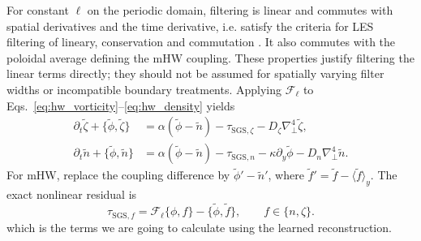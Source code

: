 \documentclass[authoryear,preprint,review,12pt]{elsarticle}
\begin{document}
For constant $\ell$ on the periodic domain, filtering is linear and commutes with spatial derivatives and the time derivative, i.e. satisfy the criteria for LES filtering of lineary, conservation and commutation \citep{sagaut_large_2006}. It also commutes with the poloidal average defining the mHW coupling. These properties justify filtering the linear terms directly; they should not be assumed for spatially varying filter widths or incompatible boundary treatments. Applying $\mathcal{F}_\ell$ to Eqs.~\eqref{eq:hw_vorticity}--\eqref{eq:hw_density} yields
\begin{align}
    \partial_t\widetilde\zeta+\{\widetilde\phi,\widetilde\zeta\}
    &=\alpha(\widetilde\phi-\widetilde n)
      -\tau_{\mathrm{SGS},\zeta}-D_\zeta\nabla_\perp^4\widetilde\zeta,
    \label{eq:filtered_hw_vorticity}\\
    \partial_t\widetilde n+\{\widetilde\phi,\widetilde n\}
    &=\alpha(\widetilde\phi-\widetilde n)
      -\tau_{\mathrm{SGS},n}-\kappa\partial_y\widetilde\phi
      -D_n\nabla_\perp^4\widetilde n.
    \label{eq:filtered_hw_density}
\end{align}
For mHW, replace the coupling difference by $\widetilde\phi'-\widetilde n'$, where $\widetilde f'=\widetilde f-\langle\widetilde f\rangle_y$. The exact nonlinear residual is
\begin{equation}
    \tau_{\mathrm{SGS},f}
    =\mathcal{F}_\ell\{\phi,f\}-\{\widetilde\phi,\widetilde f\},
    \qquad f\in\{n,\zeta\}.
    \label{eq:sgs_bracket}
\end{equation}
which is the terms we are going to calculate using the learned reconstruction.
\end{document}
